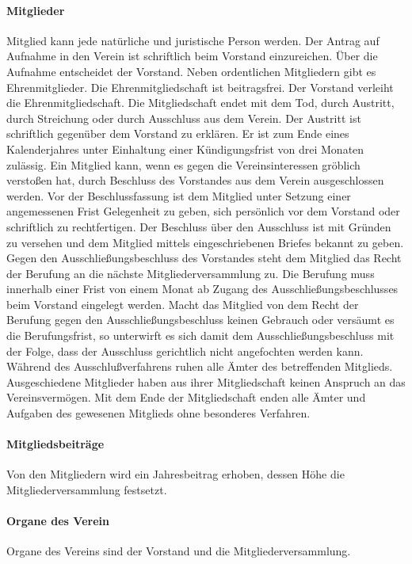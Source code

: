 \begin{multicols}{2}
\paragraph{Mitglieder}
Mitglied kann jede natürliche und juristische Person werden. Der Antrag auf
Aufnahme in den Verein ist schriftlich beim Vorstand einzureichen. Über die
Aufnahme entscheidet der Vorstand. Neben ordentlichen Mitgliedern gibt es
Ehrenmitglieder. Die Ehrenmitgliedschaft ist beitragsfrei. Der Vorstand
verleiht die Ehrenmitgliedschaft. Die Mitgliedschaft endet mit dem Tod,
durch Austritt, durch Streichung oder durch Ausschluss aus dem Verein.
Der Austritt ist schriftlich gegenüber dem Vorstand zu erklären. Er ist zum
Ende eines Kalenderjahres unter Einhaltung einer Kündigungsfrist von drei
Monaten zulässig. Ein Mitglied kann, wenn es gegen die Vereinsinteressen
gröblich verstoßen hat, durch Beschluss des Vorstandes aus dem Verein
ausgeschlossen werden. Vor der Beschlussfassung ist dem Mitglied unter
Setzung einer angemessenen Frist Gelegenheit zu geben, sich persönlich
vor dem Vorstand oder schriftlich zu rechtfertigen. Der Beschluss über den
Ausschluss ist mit Gründen zu versehen und dem Mitglied mittels
eingeschriebenen Briefes bekannt zu geben. Gegen den
Ausschließungsbeschluss des Vorstandes steht dem Mitglied das Recht der
Berufung an die nächste Mitgliederversammlung zu. Die Berufung muss
innerhalb einer Frist von einem Monat ab Zugang des
Ausschließungsbeschlusses beim Vorstand eingelegt werden. Macht das
Mitglied von dem Recht der Berufung gegen den Ausschließungsbeschluss
keinen Gebrauch oder versäumt es die Berufungsfrist, so unterwirft es sich
damit dem Ausschließungsbeschluss mit der Folge, dass der Ausschluss
gerichtlich nicht angefochten werden kann. Während des
Ausschlußverfahrens ruhen alle Ämter des betreffenden Mitglieds.
Ausgeschiedene Mitglieder haben aus ihrer Mitgliedschaft keinen Anspruch
an das Vereinsvermögen. Mit dem Ende der Mitgliedschaft enden alle
Ämter und Aufgaben des gewesenen Mitglieds ohne besonderes Verfahren.
\paragraph{Mitgliedsbeiträge}
Von den Mitgliedern wird ein Jahresbeitrag erhoben, dessen Höhe die
Mitgliederversammlung festsetzt.
\paragraph{Organe des Verein}
Organe des Vereins sind der Vorstand und die Mitgliederversammlung.

\end{multicols}
